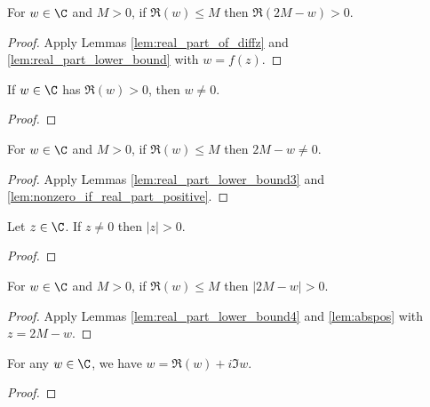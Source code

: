 \begin{lemma}\label{lem:real_part_lower_bound3}  \leanok
For $w\in\C$ and $M>0$, if $\Re(w) \le M$ then $\Re(2M - w) > 0$.
\end{lemma}
\begin{proof} \leanok {}
Apply Lemmas \ref{lem:real_part_of_diffz} and \ref{lem:real_part_lower_bound} with $w=f(z)$.
\end{proof}

\begin{lemma}\label{lem:nonzero_if_real_part_positive}  \leanok
If $w \in \C$ has $\Re(w) > 0$, then $w \neq 0$.
\end{lemma}
\begin{proof} \leanok
\end{proof}

\begin{lemma}\label{lem:real_part_lower_bound4}  \leanok
For $w\in\C$ and $M>0$, if $\Re(w) \le M$ then $2M - w\neq 0$.
\end{lemma}
\begin{proof} \leanok {}
Apply Lemmas \ref{lem:real_part_lower_bound3} and \ref{lem:nonzero_if_real_part_positive}.
\end{proof}

\begin{lemma}\label{lem:abspos}  \leanok
Let $z\in\C$. If $z\neq0$ then $|z|>0$.
\end{lemma}
\begin{proof} \leanok
\end{proof}

\begin{lemma}\label{lem:real_part_lower_bound5}  \leanok
For $w\in\C$ and $M>0$, if $\Re(w) \le M$ then $|2M - w|>0$.
\end{lemma}
\begin{proof} \leanok {}
Apply Lemmas \ref{lem:real_part_lower_bound4} and \ref{lem:abspos} with $z=2M-w$.
\end{proof}


\begin{lemma}\label{lem:wReIm}  \leanok
For any $w \in \C$, we have $w=\Re(w) + i\Im w$.
\end{lemma}
\begin{proof} \leanok
\end{proof}



